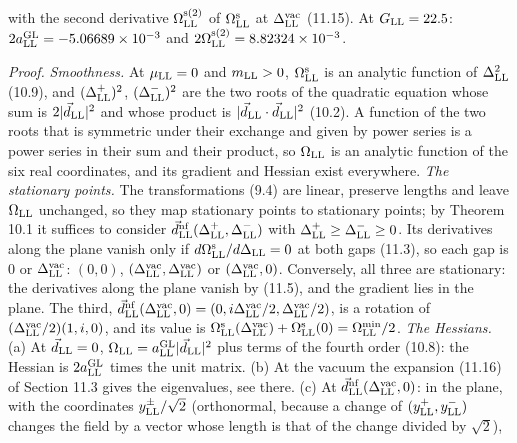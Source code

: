 \documentclass[
  10pt,
]{article}
\begin{document}
with the second derivative \(\Omega^{\rm s(2)}_{\rm LL}\) of
\(\Omega^{\rm s}_{\rm LL}\) at \(\Delta^{\rm vac}_{\rm LL}\) (11.15). At
\(G_{\rm LL}=22.5\): \(2a^{\rm GL}_{\rm LL}=-5.06689\times10^{-3}\) and
\(2\Omega^{\rm s(2)}_{\rm LL}=8.82324\times10^{-3}\).

\emph{Proof.} \emph{Smoothness.} At \(\mu_{\rm LL}=0\) and
\(m_{\rm LL}>0\), \(\Omega^{\rm s}_{\rm LL}\) is an analytic function of
\(\Delta_{\rm LL}^2\) (10.9), and \((\Delta^+_{\rm LL})^2\),
\((\Delta^-_{\rm LL})^2\) are the two roots of the quadratic equation
whose sum is \(2\lvert\vec d_{\rm LL}\rvert^2\) and whose product is
\(\lvert\vec d_{\rm LL}\cdot\vec d_{\rm LL}\rvert^2\) (10.2). A function
of the two roots that is symmetric under their exchange and given by
power series is a power series in their sum and their product, so
\(\Omega_{\rm LL}\) is an analytic function of the six real coordinates,
and its gradient and Hessian exist everywhere. \emph{The stationary
points.} The transformations (9.4) are linear, preserve lengths and
leave \(\Omega_{\rm LL}\) unchanged, so they map stationary points to
stationary points; by Theorem 10.1 it suffices to consider
\(\vec d^{\rm nf}_{\rm LL}(\Delta^+_{\rm LL},\Delta^-_{\rm LL})\) with
\(\Delta^+_{\rm LL}\ge\Delta^-_{\rm LL}\ge0\). Its derivatives along the
plane vanish only if \(d\Omega^{\rm s}_{\rm LL}/d\Delta_{\rm LL}=0\) at
both gaps (11.3), so each gap is 0 or \(\Delta^{\rm vac}_{\rm LL}\):
\((0,0)\), \((\Delta^{\rm vac}_{\rm LL},\Delta^{\rm vac}_{\rm LL})\) or
\((\Delta^{\rm vac}_{\rm LL},0)\). Conversely, all three are stationary:
the derivatives along the plane vanish by (11.5), and the gradient lies
in the plane. The third,
\(\vec d^{\rm nf}_{\rm LL}(\Delta^{\rm vac}_{\rm LL},0)=(0,i\Delta^{\rm vac}_{\rm LL}/2,\Delta^{\rm vac}_{\rm LL}/2)\),
is a rotation of \((\Delta^{\rm vac}_{\rm LL}/2)(1,i,0)\), and its value
is
\(\Omega^{\rm s}_{\rm LL}(\Delta^{\rm vac}_{\rm LL})+\Omega^{\rm s}_{\rm LL}(0)=\Omega^{\rm min}_{\rm LL}/2\).
\emph{The Hessians.} (a) At \(\vec d_{\rm LL}=0\),
\(\Omega_{\rm LL}=a^{\rm GL}_{\rm LL}\lvert\vec d_{\rm LL}\rvert^2\)
plus terms of the fourth order (10.8): the Hessian is
\(2a^{\rm GL}_{\rm LL}\) times the unit matrix. (b) At the vacuum the
expansion (11.16) of Section 11.3 gives the eigenvalues, see there. (c)
At \(\vec d^{\rm nf}_{\rm LL}(\Delta^{\rm vac}_{\rm LL},0)\): in the
plane, with the coordinates \(y^\pm_{\rm LL}/\sqrt2\) (orthonormal,
because a change of \((y^+_{\rm LL},y^-_{\rm LL})\) changes the field by
a vector whose length is that of the change divided by \(\sqrt2\)),
\end{document}
